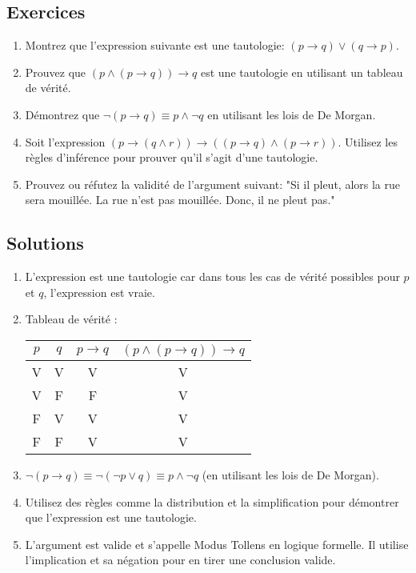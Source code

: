 \documentclass{article}
\begin{document}
\subsection{Exercices}
\begin{enumerate}
    \item Montrez que l'expression suivante est une tautologie: \((p \rightarrow q) \lor (q \rightarrow p)\).
    \item Prouvez que \((p \land (p \rightarrow q)) \rightarrow q\) est une tautologie en utilisant un tableau de vérité.
    \item Démontrez que \(\neg(p \rightarrow q) \equiv p \land \neg q\) en utilisant les lois de De Morgan.
    \item Soit l'expression \((p \rightarrow (q \land r)) \rightarrow ((p \rightarrow q) \land (p \rightarrow r))\). Utilisez les règles d'inférence pour prouver qu'il s'agit d'une tautologie.
    \item Prouvez ou réfutez la validité de l'argument suivant: "Si il pleut, alors la rue sera mouillée. La rue n'est pas mouillée. Donc, il ne pleut pas."
\end{enumerate}

\subsection{Solutions}
\begin{enumerate}
    \item L'expression est une tautologie car dans tous les cas de vérité possibles pour \(p\) et \(q\), l'expression est vraie.
    \item Tableau de vérité :
    \begin{center}
    \begin{tabular}{|c|c|c|c|}
    \hline
    \(p\) & \(q\) & \(p \rightarrow q\) & \((p \land (p \rightarrow q)) \rightarrow q\) \\
    \hline
    V & V & V & V \\
    V & F & F & V \\
    F & V & V & V \\
    F & F & V & V \\
    \hline
    \end{tabular}
    \end{center}
    \item \(\neg(p \rightarrow q) \equiv \neg(\neg p \lor q) \equiv p \land \neg q\) (en utilisant les lois de De Morgan).
    \item Utilisez des règles comme la distribution et la simplification pour démontrer que l'expression est une tautologie.
    \item L'argument est valide et s'appelle Modus Tollens en logique formelle. Il utilise l'implication et sa négation pour en tirer une conclusion valide.
\end{enumerate}
\end{document}
